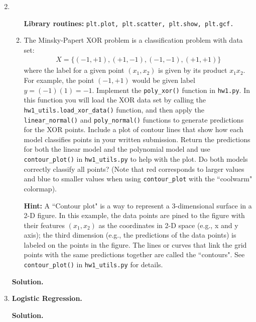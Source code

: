 \documentclass{article}
\theoremstyle{definition}
\theoremstyle{remark}
\newenvironment{Q}
{%
  \clearpage
  \item
  }
  {%
    \phantom{s} %
    \bigskip
    \textbf{Solution.}
  }
\begin{document}
\begin{enumerate}[font={\Large\bfseries},left=0pt]
\begin{Q}
\begin{enumerate}
  \textbf{Library routines:} \texttt{plt.plot, plt.scatter, plt.show, plt.gcf.}
  
  \item The Minsky-Papert XOR problem is a classification problem with data set: \begin{align*}
  X = \{(-1,+1), (+1,-1), (-1,-1),(+1,+1)\}
\end{align*}
where the label for a given point $(x_1,x_2)$ is given by its product $x_1x_2$.  For example, the point $(-1,+1)$ would be given label $y = (-1)(1) = -1$.  Implement the \texttt{poly\_xor()} function in \texttt{hw1.py}.  In this function you will load the XOR data set by calling the \texttt{hw1\_utils.load\_xor\_data()} function, and then apply the \texttt{linear\_normal()} and \texttt{poly\_normal()} functions to generate predictions for the XOR points. Include a plot of contour lines that show how each model classifies points in your written submission. Return the predictions for both the linear model and the polynomial model and use \texttt{contour\_plot()} in \texttt{hw1\_utils.py} to help with the plot. Do both models correctly classify all points? (Note that red corresponds to larger values and blue to smaller values when using \texttt{contour\_plot} with the ``coolwarm" colormap).

\textbf{Hint:} A ``Contour plot" is a way to represent a 3-dimensional surface in a 2-D figure. In this example, the data points are pined to the figure with their features $(x_1, x_2)$ as the coordinates in 2-D space (e.g., x and y axis); the third dimension (e.g., the predictions of the data points) is labeled on the points in the figure. The lines or curves that link the grid points with the same predictions together are called the ``contours". See \texttt{contour\_plot()} in \texttt{hw1\_utils.py} for details.
  \end{enumerate}
  \end{Q}

    \begin{Q}
  \textbf{\Large Logistic Regression.}


\end{Q}
\end{enumerate}
\end{document}
